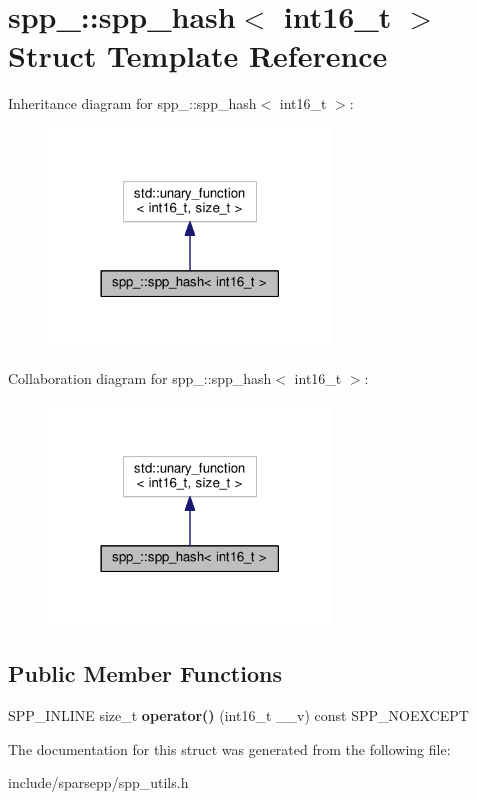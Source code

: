 \hypertarget{structspp___1_1spp__hash_3_01int16__t_01_4}{}\section{spp\+\_\+\+:\+:spp\+\_\+hash$<$ int16\+\_\+t $>$ Struct Template Reference}
\label{structspp___1_1spp__hash_3_01int16__t_01_4}


Inheritance diagram for spp\+\_\+\+:\+:spp\+\_\+hash$<$ int16\+\_\+t $>$\+:\nopagebreak
\begin{figure}[H]
\begin{center}
\leavevmode
\includegraphics[width=213pt]{structspp___1_1spp__hash_3_01int16__t_01_4__inherit__graph}
\end{center}
\end{figure}


Collaboration diagram for spp\+\_\+\+:\+:spp\+\_\+hash$<$ int16\+\_\+t $>$\+:\nopagebreak
\begin{figure}[H]
\begin{center}
\leavevmode
\includegraphics[width=213pt]{structspp___1_1spp__hash_3_01int16__t_01_4__coll__graph}
\end{center}
\end{figure}
\subsection*{Public Member Functions}
\begin{DoxyCompactItemize}
\item 
S\+P\+P\+\_\+\+I\+N\+L\+I\+NE size\+\_\+t {\bfseries operator()} (int16\+\_\+t \+\_\+\+\_\+v) const S\+P\+P\+\_\+\+N\+O\+E\+X\+C\+E\+PT\hypertarget{structspp___1_1spp__hash_3_01int16__t_01_4_a4d3c1ef4203715de75b24972d59a24ea}{}\label{structspp___1_1spp__hash_3_01int16__t_01_4_a4d3c1ef4203715de75b24972d59a24ea}

\end{DoxyCompactItemize}


The documentation for this struct was generated from the following file\+:\begin{DoxyCompactItemize}
\item 
include/sparsepp/spp\+\_\+utils.\+h\end{DoxyCompactItemize}
